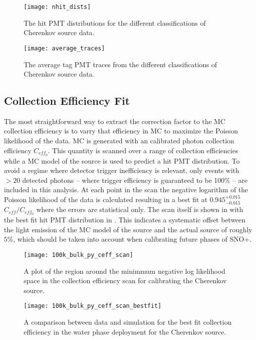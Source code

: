\begin{figure}
\centering
\texttt{[image: nhit\_dists]}
\caption{\label{fig:chsrc_nhits} The hit PMT distributions for the different classifications of Cherenkov source data.}
\end{figure}


\begin{figure}
\centering
\texttt{[image: average\_traces]}
\caption{\label{fig:chsrc_pmttraces} The average tag PMT traces from the different classifications of Cherenkov source data.}
\end{figure}

\subsection{Collection Efficiency Fit}
\label{sec:water_fit}
The most straightforward way to extract the correction factor to the MC collection efficiency is to varry that efficiency in MC to maximize the Poisson likelihood of the data.
MC is generated with an \N calibrated photon collection efficiency $C_{eff_0}$.
This quantity is scanned over a range of collection efficiencies while a MC model of the source is used to predict a hit PMT distribution.
To avoid a regime where detector trigger inefficiency is relevant, only events with $>20$ detected photons -- where trigger efficiency is guaranteed to be 100$\%$ -- are included in this analysis.
At each point in the scan the negative logarithm of the Poisson likelihood of the data is calculated resulting in a best fit at $0.945^{+0.015}_{-0.015}$ $C_{eff}/C_{eff_0}$ where the errors are statistical only.
The scan itself is shown in  with the best fit hit PMT distribution in .
This indicates a systematic offset between the light emission of the MC model of the source and the actual source of roughly $5\%$, which should be taken into account when calibrating future phases of SNO+.

\begin{figure}
\centering
\texttt{[image: 100k\_bulk\_py\_ceff\_scan]}
\caption{\label{fig:chsrc_scan} A plot of the region around the minimmum negative log likelihood space in the collection efficiency scan for calibrating the Cherenkov source.}
\end{figure}

\begin{figure}
\centering
\texttt{[image: 100k\_bulk\_py\_ceff\_scan\_bestfit]}
\caption{\label{fig:chsrc_bestfit} A comparison between data and simulation for the best fit collection efficiency in the water phase deployment for the Cherenkov source.}
\end{figure}

